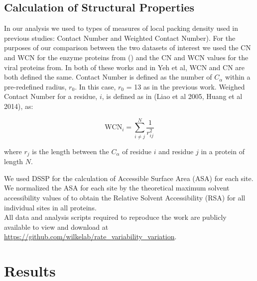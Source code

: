\documentclass[12pt]{article}
\begin{document}
    \subsection*{Calculation of Structural Properties}
In our analysis we used to types of measures of local packing density used in previous studies: Contact Number and Weighted Contact Number). For the purposes of our comparison between the two datasets of interest we used the CN and WCN for the enzyme proteins from () and the CN and WCN values for the viral proteins from. In both of these works and in Yeh et al, WCN and CN are both defined the same.  Contact Number is defined as the number of $C_{\alpha}$ within a pre-redefined radius, $r_0$. In this case, $r_0$ = 13 as in the previous work. Weighed Contact Number for a residue, $i$,  is defined as in (Liao et al 2005, Huang et al 2014), as:
	
	\begin{equation} \label{wcn_eqn}
		\text{WCN}_i = \sum_{i \neq j}^{N} \frac{1}{r_{ij}^2 } 
	\end{equation}
	
	where $r_j$ is the length between the $C_{\alpha}$ of residue $i$ and residue $j$ in a protein of length $N$. 

\indent We used DSSP \citep{Kabschetal2005}  for the calculation of Accessible Surface Area (ASA) for each site. We normalized the ASA for each site by the theoretical maximum solvent accessibility values of \cite{Tienetal2013}  to obtain the Relative Solvent Accessibility (RSA) for all individual sites in all proteins. \\

All data and analysis scripts required to reproduce the work are publicly available to view and download at \url{https://github.com/wilkelab/rate_variability_variation}.


\section{Results}
\label{sec:results}
\end{document}
